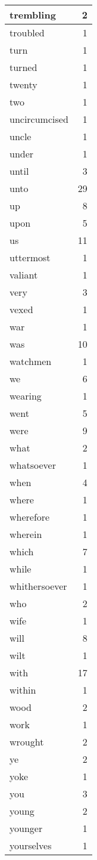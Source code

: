 \begin{center}
\begin{longtable}{l|r}
trembling & 2 \\ \hline
troubled & 1 \\ \hline
turn & 1 \\ \hline
turned & 1 \\ \hline
twenty & 1 \\ \hline
two & 1 \\ \hline
uncircumcised & 1 \\ \hline
uncle & 1 \\ \hline
under & 1 \\ \hline
until & 3 \\ \hline
unto & 29 \\ \hline
up & 8 \\ \hline
upon & 5 \\ \hline
us & 11 \\ \hline
uttermost & 1 \\ \hline
valiant & 1 \\ \hline
very & 3 \\ \hline
vexed & 1 \\ \hline
war & 1 \\ \hline
was & 10 \\ \hline
watchmen & 1 \\ \hline
we & 6 \\ \hline
wearing & 1 \\ \hline
went & 5 \\ \hline
were & 9 \\ \hline
what & 2 \\ \hline
whatsoever & 1 \\ \hline
when & 4 \\ \hline
where & 1 \\ \hline
wherefore & 1 \\ \hline
wherein & 1 \\ \hline
which & 7 \\ \hline
while & 1 \\ \hline
whithersoever & 1 \\ \hline
who & 2 \\ \hline
wife & 1 \\ \hline
will & 8 \\ \hline
wilt & 1 \\ \hline
with & 17 \\ \hline
within & 1 \\ \hline
wood & 2 \\ \hline
work & 1 \\ \hline
wrought & 2 \\ \hline
ye & 2 \\ \hline
yoke & 1 \\ \hline
you & 3 \\ \hline
young & 2 \\ \hline
younger & 1 \\ \hline
yourselves & 1 \\ \hline
\end{longtable}
\end{center}



